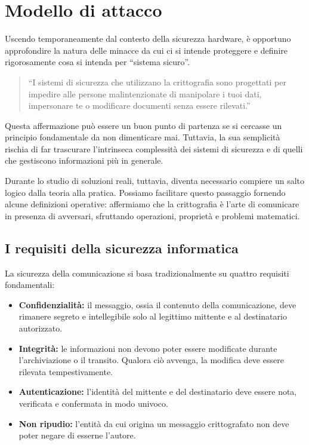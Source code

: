 \chapter{Modello di attacco}\label{ch:modello_attacco}

Uscendo temporaneamente dal contesto della sicurezza hardware, è opportuno approfondire la natura delle minacce da cui ci si intende proteggere e definire rigorosamente cosa si intenda per \enquote{sistema sicuro}.

\begin{quote}
    \enquote{I sistemi di sicurezza che utilizzano la crittografia sono progettati per impedire alle persone malintenzionate di manipolare i tuoi dati, impersonare te o modificare documenti senza essere rilevati.}
\end{quote}

Questa affermazione può essere un buon punto di partenza se si cercasse un principio fondamentale da non dimenticare mai. Tuttavia, la sua semplicità rischia di far trascurare l'intrinseca complessità dei sistemi di sicurezza e di quelli che gestiscono informazioni più in generale. 

Durante lo studio di soluzioni reali, tuttavia, diventa necessario compiere un salto logico dalla teoria alla pratica. Possiamo facilitare questo passaggio fornendo alcune definizioni operative: affermiamo che la crittografia è l'arte di comunicare in presenza di avversari, sfruttando operazioni, proprietà e problemi matematici. 


\section{I requisiti della sicurezza informatica}\label{sec:requisiti_sicurezza}
La sicurezza della comunicazione si basa tradizionalmente su quattro requisiti fondamentali:
\begin{itemize}
    \item \textbf{Confidenzialità:} il messaggio, ossia il contenuto della comunicazione, deve rimanere segreto e intellegibile solo al legittimo mittente e al destinatario autorizzato.
    \item \textbf{Integrità:} le informazioni non devono poter essere modificate durante l'archiviazione o il transito. Qualora ciò avvenga, la modifica deve essere rilevata tempestivamente.
    \item \textbf{Autenticazione:} l'identità del mittente e del destinatario deve essere nota, verificata e confermata in modo univoco.
    \item \textbf{Non ripudio:} l'entità da cui origina un messaggio crittografato non deve poter negare di esserne l'autore.
\end{itemize}


